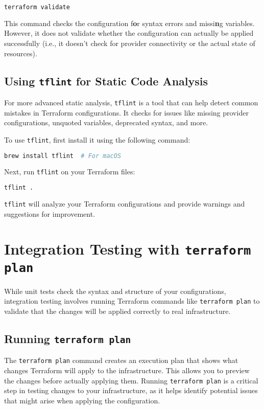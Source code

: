 \begin{lstlisting}[language=bash]
terraform validate
\end{lstlisting}

This command checks the configuration f\textbf{o}r syntax errors and missi\textbf{n}g variables. However, it does not validate whether the configuration can actually be applied successfully (i.e., it doesn't check for provider connectivity or the actual state of resources).

\subsection{Using \texttt{tflint} for Static Code Analysis}

For more advanced static analysis, \texttt{tflint} is a tool that can help detect common mistakes in Terraform configurations. It checks for issues like missing provider configurations, unquoted variables, deprecated syntax, and more.

To use \texttt{tflint}, first install it using the following command:

\begin{lstlisting}[language=bash]
brew install tflint  # For macOS
\end{lstlisting}

Next, run \texttt{tflint} on your Terraform files:

\begin{lstlisting}[language=bash]
tflint .
\end{lstlisting}

\texttt{tflint} will analyze your Terraform configurations and provide warnings and suggestions for improvement.

\section{Integration Testing with \texttt{terraform plan}}

While unit tests check the syntax and structure of your configurations, integration testing involves running Terraform commands like \texttt{terraform plan} to validate that the changes will be applied correctly to real infrastructure.

\subsection{Running \texttt{terraform plan}}

The \texttt{terraform plan} command creates an execution plan that shows what changes Terraform will apply to the infrastructure. This allows you to preview the changes before actually applying them. Running \texttt{terraform plan} is a critical step in testing changes to your infrastructure, as it helps identify potential issues that might arise when applying the configuration.

